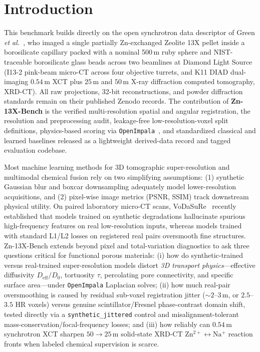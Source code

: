 \documentclass[10pt]{article}
\begin{document}
\section{Introduction}
\label{sec:intro}

This benchmark builds directly on the open synchrotron data descriptor of Green \emph{et al.}~\cite{green2025synchrotron}, who imaged a single partially Zn-exchanged Zeolite 13X pellet inside a borosilicate capillary packed with a nominal 500\,\textmu m ruby sphere and NIST-traceable borosilicate glass beads across two beamlines at Diamond Light Source (I13-2 pink-beam micro-CT across four objective turrets, and K11 DIAD dual-imaging $0.54$\,\textmu m XCT plus $25$\,\textmu m and $50$\,\textmu m X-ray diffraction computed tomography, XRD-CT). All raw projections, 32-bit reconstructions, and powder diffraction standards remain on their published Zenodo records. The contribution of \textbf{Zn-13X-Bench} is the verified multi-resolution spatial and angular registration, the resolution and preprocessing audit, leakage-free low-resolution-voxel split definitions, physics-based scoring via \texttt{OpenImpala}~\cite{lehoux2021openimpala,lehoux2023diffusivity}, and standardized classical and learned baselines released as a lightweight derived-data record and tagged evaluation codebase.

Most machine learning methods for 3D tomographic super-resolution and multimodal chemical fusion rely on two simplifying assumptions: (1) synthetic Gaussian blur and boxcar downsampling adequately model lower-resolution acquisitions, and (2) pixel-wise image metrics (PSNR, SSIM) track downstream physical utility. On paired laboratory micro-CT scans, VoDaSuRe~\cite{hoeg2026vodasure} recently established that models trained on synthetic degradations hallucinate spurious high-frequency features on real low-resolution inputs, whereas models trained with standard L1/L2 losses on registered real pairs oversmooth fine structures. Zn-13X-Bench extends beyond pixel and total-variation diagnostics to ask three questions critical for functional porous materials: (i) how do synthetic-trained versus real-trained super-resolution models distort \emph{3D transport physics}---effective diffusivity $D_{\mathrm{eff}}/D_0$, tortuosity $\tau$, percolating pore connectivity, and specific surface area---under \texttt{OpenImpala} Laplacian solves; (ii) how much real-pair oversmoothing is caused by residual sub-voxel registration jitter ($\sim 2$--$3$\,\textmu m, or $2.5$--$3.5$ HR voxels) versus genuine scintillator/Fresnel phase-contrast domain shift, tested directly via a \texttt{synthetic\_jittered} control and misalignment-tolerant mass-conservation/focal-frequency losses; and (iii) how reliably can $0.54$\,\textmu m synchrotron XCT sharpen $50 \to 25$\,\textmu m solid-state XRD-CT $\mathrm{Zn^{2+} \leftrightarrow Na^+}$ reaction fronts when labeled chemical supervision is scarce.
\end{document}

